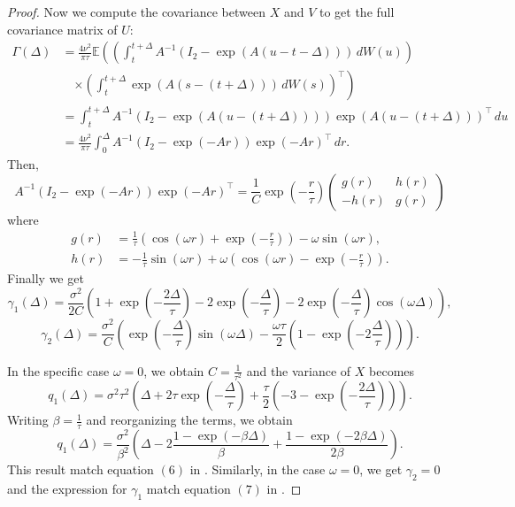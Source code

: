 \documentclass[aoas]{imsart}
\theoremstyle{definition}
\theoremstyle{remark}
\theoremstyle{remark}
\newcommand {\E}{\mathbb{E}}
\newcommand {\1}{\mathbb{1}}
\begin{document}
\begin{proof}
Now we compute the covariance between   $X$ and $V$ to get the full covariance matrix of $U$:
\begin{align*}
    \Gamma(\Delta) &= \frac{4\nu^2}{\pi \tau} \E\left(\left( \int_t^{t+\Delta} A^{-1}(I_2-\exp(A(u-t-\Delta))) \, dW(u)\right) \right. \\
    &\quad \left. \times \left(\int_{t}^{t+\Delta} \exp(A(s-(t+\Delta))) \, dW(s)\right)^\top\right) \\
    &= \int_t^{t+\Delta} A^{-1}(I_2-\exp(A(u-(t+\Delta)))) \exp(A(u-(t+\Delta)))^\top \, du \\
    &= \frac{4\nu^2}{\pi \tau} \int_0^{\Delta} A^{-1}(I_2-\exp(-Ar)) \exp(-Ar)^\top \, dr.
\end{align*}
	Then, 
	\[A^{-1}(I_2-\exp(-Ar)) \exp(-Ar)^\top=\frac{1}{C}\exp\left(-\frac{r}{\tau} \right) \begin{pmatrix} g(r) & h(r) \\ -h(r) & g(r) \end{pmatrix}\]
	where 
\begin{align*}
    g(r) &= \frac{1}{\tau} \left(\cos(\omega r) + \exp\left( -\frac{r}{\tau} \right)\right) 
    - \omega \sin(\omega r), \\
    h(r) &= -\frac{1}{\tau} \sin(\omega r) 
    + \omega \left(\cos(\omega r) - \exp\left( -\frac{r}{\tau}\right)\right).
\end{align*}
	Finally we get
	\[
	\gamma_1(\Delta)=\frac{\sigma^2}{2C}\left( 1+\exp\left( -\frac{2\Delta}{\tau}\right)-2\exp\left( -\frac{\Delta}{\tau}\right)-2\exp\left( -\frac{\Delta}{\tau}\right) \cos(\omega \Delta)\right),
	\]
	\[\gamma_2(\Delta)=\frac{\sigma^2}{C}\left( \exp\left( -\frac{\Delta}{\tau}\right) \sin(\omega \Delta)-\frac{\omega \tau}{2} \left(1-\exp\left( -2 \frac{\Delta}{\tau}\right) \right)\right).\]
	
	In the specific case $\omega=0$, we obtain $C=\frac{1}{\tau^2}$ and the variance of  $X$ becomes 
	\[q_1(\Delta)=\sigma^2 \tau^2\left( \Delta +2\tau\exp\left( -\frac{\Delta}{\tau}\right)+\frac{\tau}{2}\left( -3 -\exp\left( -\frac{2\Delta}{\tau}\right) \right)\right).
	\]
	Writing $\beta=\frac{1}{\tau}$ and reorganizing the terms, we obtain
	\begin{equation}q_1(\Delta)=\frac{\sigma^2}{\beta^2}\left(\Delta -2 \frac{1-\exp(-\beta \Delta)}{\beta}+\frac{1-\exp(-2\beta \Delta)}{2\beta}\right).
	\end{equation}
	This result match equation $(6)$ in \citep{johnson_continuous_2008}. Similarly, in the case $\omega=0$, we get $\gamma_2=0$ and the expression for $\gamma_1$ match equation $(7)$ in \citep{johnson_continuous_2008}.
	
\end{proof}
\end{document}
